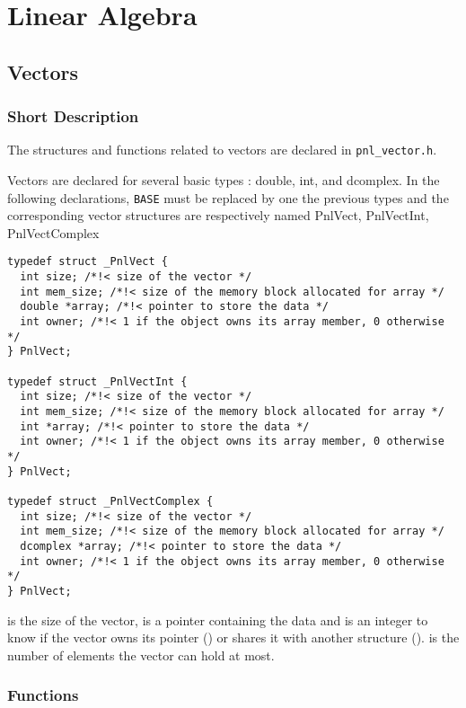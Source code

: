 \section{Linear Algebra}

\subsection{Vectors}
\subsubsection{Short Description}

The structures and functions related to vectors are declared in
\verb!pnl_vector.h!.


Vectors are declared for several basic types : double, int, and
dcomplex. In the following declarations, {\tt BASE} must be replaced by one
the previous types and the corresponding vector structures are respectively
named PnlVect, PnlVectInt, PnlVectComplex
\begin{verbatim}
typedef struct _PnlVect {
  int size; /*!< size of the vector */
  int mem_size; /*!< size of the memory block allocated for array */
  double *array; /*!< pointer to store the data */
  int owner; /*!< 1 if the object owns its array member, 0 otherwise */
} PnlVect;

typedef struct _PnlVectInt {
  int size; /*!< size of the vector */ 
  int mem_size; /*!< size of the memory block allocated for array */
  int *array; /*!< pointer to store the data */
  int owner; /*!< 1 if the object owns its array member, 0 otherwise */
} PnlVect;

typedef struct _PnlVectComplex {
  int size; /*!< size of the vector */ 
  int mem_size; /*!< size of the memory block allocated for array */
  dcomplex *array; /*!< pointer to store the data */
  int owner; /*!< 1 if the object owns its array member, 0 otherwise */
} PnlVect;
\end{verbatim}
 is the size of the vector,  is a pointer containing the
data and  is an integer to know if the vector owns its 
pointer () or shares it with another structure ().
 is the number of elements the vector can hold at most.

\subsubsection{Functions}

